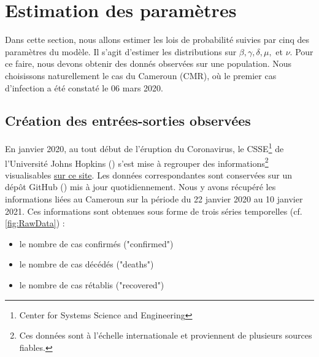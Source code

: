 \documentclass[
  french,
	10pt, %
]{fphw}
\begin{document}
\section{Estimation des paramètres}

Dans cette section, nous allons estimer les lois de probabilité suivies par cinq des paramètres du modèle. Il s'agit d'estimer les distributions sur $\beta, \gamma, \delta, \mu, $ et $\nu$. Pour ce faire, nous devons obtenir des donnés observées sur une population. Nous choisissons naturellement le cas du Cameroun (CMR), où le premier cas d'infection a été constaté le 06 mars 2020. 

\subsection{Création des entrées-sorties observées}

En janvier 2020, au tout début de l'éruption du Coronavirus, le CSSE\footnote{Center for Systems Science and Engineering} de l'Université Johns Hopkins (\cite{JHU}) s'est mise à regrouper des informations\footnote{Ces données sont à l'échelle internationale et proviennent de plusieurs sources fiables.} visualisables \href{https://www.arcgis.com/apps/opsdashboard/index.html#/bda7594740fd40299423467b48e9ecf6}{sur ce site}. Les données correspondantes sont conservées sur un dépôt GitHub (\cite{GitHub}) mis à jour quotidiennement. Nous y avons récupéré les informations liées au Cameroun sur la période du 22 janvier 2020 au 10 janvier 2021. Ces informations sont obtenues sous forme de trois séries temporelles (cf. \cref{fig:RawData}) : 
\begin{itemize}
  \item le nombre de cas confirmés ("confirmed")
  \item le nombre de cas décédés ("deaths")
  \item le nombre de cas rétablis ("recovered")
\end{itemize}
\end{document}
